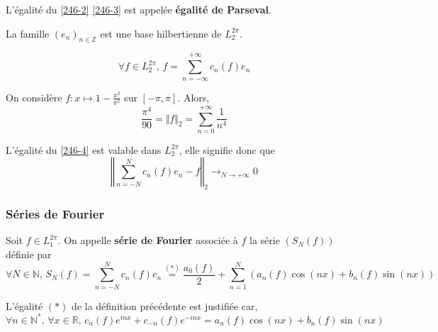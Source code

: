 	\begin{remark}
		L'égalité du \cref{246-2} \cref{246-3} est appelée \textbf{égalité de Parseval}.
	\end{remark}


	\begin{theorem}
		La famille $(e_n)_{n \in \mathbb{Z}}$ est une base hilbertienne de $L_2^{2 \pi}$.
	\end{theorem}

	\begin{corollary}
		\label{246-4}
		\[ \forall f \in L_2^{2 \pi}, \, f = \sum_{n = -\infty}^{+\infty} c_n(f) e_n \]
	\end{corollary}


	\begin{example}
		\label{246-5}
		On considère $f : x \mapsto 1 - \frac{x^2}{\pi^2}$ sur $[-\pi, \pi]$. Alors,
		\[ \frac{\pi^4}{90} = \Vert f \Vert_2 = \sum_{n=0}^{+\infty} \frac{1}{n^4} \]
	\end{example}


	\begin{remark}
		L'égalité du \cref{246-4} est valable dans $L_2^{2\pi}$, elle signifie donc que
		\[ \left\Vert \sum_{n = -N}^{N} c_n(f) e_n - f \right\Vert_2 \longrightarrow_{N \rightarrow +\infty} 0 \]
	\end{remark}

	\subsubsection{Séries de Fourier}


	\begin{definition}
		Soit $f \in L_1^{2\pi}$. On appelle \textbf{série de Fourier} associée à $f$ la série $(S_N(f))$ définie par
		\[ \forall N \in \mathbb{N}, \, S_N(f) = \sum_{n=-N}^{N} c_n(f) e_n \overset{(*)}{=} \frac{a_0(f)}{2} + \sum_{n = 1}^N (a_n(f) \cos(nx) + b_n(f) \sin(nx)) \]
	\end{definition}

	\begin{remark}
		L'égalité $(*)$ de la définition précédente est justifiée car,
		\[ \forall n \in \mathbb{N}^*, \, \forall x \in \mathbb{R}, \, c_n(f) e^{inx} + c_{-n}(f) e^{-inx} = a_n(f) \cos(nx) + b_n(f) \sin(nx) \]
	\end{remark}

